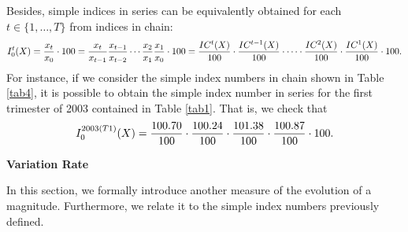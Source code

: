 Besides, simple indices in series can be equivalently obtained for each $t\in \{1,\dots,T\}$ from indices in chain:\vspace*{-0.05 cm}
$$I_0^t(X)=\frac{x_t}{x_{0}}\cdot 100=\frac{x_t}{x_{t-1}}\frac{x_{t-1}}{x_{t-2}}\cdots   \frac{x_2}{x_{1}}\frac{x_1}{x_{0}} \cdot 100=\frac{IC^t(X)}{100}\cdot\frac{IC^{t-1}(X)}{100}\cdot \cdots \cdot \frac{IC^{2}(X)}{100}\cdot \frac{IC^{1}(X)}{100}\cdot 100. \vspace*{-0.05 cm}$$
For instance, if we consider the simple index numbers in chain shown in Table \ref{tab4}, it is possible to obtain the simple index number in series for the first trimester of 2003 contained in Table \ref{tab1}. That is, we check that\vspace*{-0.05 cm}
$$I_0^{2003(T1)}(X)=   \frac{100.70}{100} \cdot \frac{100.24}{100}    \cdot \frac{101.38}{100}    \cdot \frac{100.87}{100} \cdot 100.\vspace*{-0.05 cm} $$



\vspace*{0.1 cm}\noindent\textbf{Variation Rate}

\noindent In this section, we formally introduce another measure of the evolution of a magnitude. Furthermore, we relate it to the simple index numbers previously defined.

